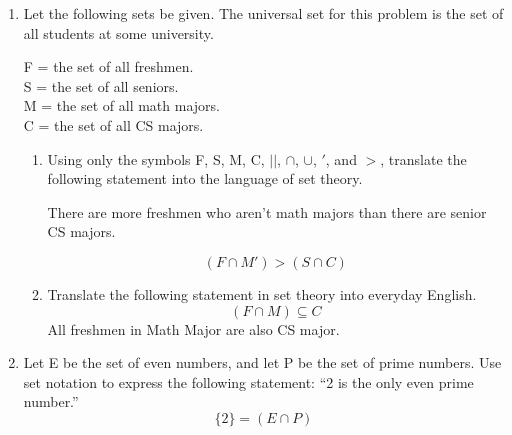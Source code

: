 \documentclass[12pt]{article}
\begin{document}
\begin{enumerate}
  \item Let the following sets be given. The universal set for this problem is the set of all students at some university.
  \begin{center}
    F = the set of all freshmen.\\
    S = the set of all seniors.\\
    M = the set of all math majors.\\
    C = the set of all CS majors.\\
  \end{center}
  \begin{enumerate}
    \item Using only the symbols F, S, M, C, $||$, $\cap$, $\cup$, $'$, and $>$, translate the following statement into the language of set theory.
    \begin{center}
      There are more freshmen who aren’t math majors than there are senior CS majors.
    \end{center}
      \[(F \cap M') > (S \cap C)\]
    \item Translate the following statement in set theory into everyday English.
      \[(F \cap M) \subseteq C\]
      All freshmen in Math Major are also CS major.
  \end{enumerate}
  
  \item Let E be the set of even numbers, and let P be the set of prime numbers. Use set notation to express the following statement: “2 is the only even prime number.”
  \[\{2\} = (E \cap P)\]


\end{enumerate}
\end{document}
